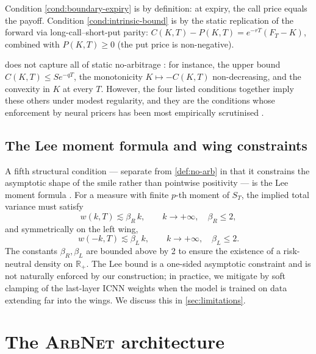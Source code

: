 \documentclass[largeformat]{interact}
\let\cite\citep   %
\theoremstyle{plain}
\theoremstyle{definition}
\newcommand{\R}{\mathbb{R}}
\newcommand{\arbnet}{\textsc{ArbNet}}
\begin{document}
Condition \ref{cond:boundary-expiry} is by definition: at expiry, the call price equals the payoff. Condition \ref{cond:intrinsic-bound} is by the static replication of the forward via long-call--short-put parity: $C(K, T) - P(K, T) = e^{-rT}(F_T - K)$, combined with $P(K, T) \geq 0$ (the put price is non-negative).

 does not capture all of static no-arbitrage \cite{cousot2007conditions,davis2007arbitrage}: for instance, the upper bound $C(K, T) \leq Se^{-qT}$, the monotonicity $K \mapsto -C(K, T)$ non-decreasing, and the convexity in $K$ at every $T$. However, the four listed conditions together imply these others under modest regularity, and they are the conditions whose enforcement by neural pricers has been most empirically scrutinised \cite{ackerer2020deep,chataigner2020deep,horvath2021deep,ruf2020neural}.

\subsection{The Lee moment formula and wing constraints}
\label{sec:lee-wings}

A fifth structural condition --- separate from \cref{def:no-arb} in that it constrains the asymptotic shape of the smile rather than pointwise positivity --- is the Lee moment formula \cite{lee2004moment,lee2005implied}. For a measure with finite $p$-th moment of $S_T$, the implied total variance must satisfy
\begin{equation}
w(k, T) \lesssim \beta_R\,k, \qquad k \to +\infty, \quad \beta_R \leq 2,
\end{equation}
and symmetrically on the left wing,
\begin{equation}
w(-k, T) \lesssim \beta_L\,k, \qquad k \to +\infty, \quad \beta_L \leq 2.
\end{equation}
The constants $\beta_R, \beta_L$ are bounded above by 2 to ensure the existence of a risk-neutral density on $\R_+$. The Lee bound is a one-sided asymptotic constraint and is not naturally enforced by our construction; in practice, we mitigate by soft clamping of the last-layer ICNN weights when the model is trained on data extending far into the wings. We discuss this in \cref{sec:limitations}.

\section{The \texorpdfstring{\arbnet{}}{ArbNet} architecture}
\label{sec:architecture}
\end{document}

